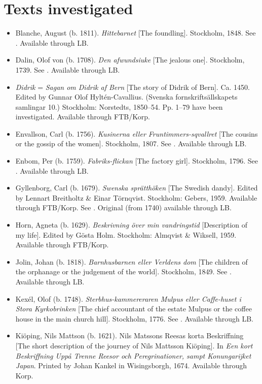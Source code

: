\documentclass[output=paper]{langscibook}
\begin{document}
\section*{Texts investigated}
\begin{itemize}[label={},noitemsep,leftmargin=\parindent,itemindent=-\parindent]\sloppy
\item Blanche, August (b. 1811). \textit{Hittebarnet} [The foundling]. Stockholm, 1848. See \citet{MarttalaStromquist2001}. Available through LB.
\item Dalin, Olof von (b. 1708). \textit{Den afwundsiuke} [The jealous one]. Stockholm, 1739. See \citet{MarttalaStromquist2001}. Available through LB.
\item \textit{Didrik} = \textit{Sagan om Didrik af Bern} [The story of Didrik of Bern]. Ca. 1450. Edited by Gunnar Olof Hyltén-Cavallius. (Svenska fornskriftsällskapets samlingar 10.) Stockholm: Norstedts, 1850–54. Pp. 1–79 have been investigated. Available through FTB/Korp.
\item Envallson, Carl (b. 1756). \textit{Kusinerna eller Fruntimmers-sqvallret} [The cousins or the gossip of the women]. Stockholm, 1807. See \citet{MarttalaStromquist2001}. Available through LB.
\item Enbom, Per (b. 1759). \textit{Fabriks-flickan} [The factory girl]. Stockholm, 1796. See \citet{MarttalaStromquist2001}. Available through LB.
\item Gyllenborg, Carl (b. 1679). \textit{Swenska sprätthöken} [The Swedish dandy]. Edited by Lennart Breitholtz \& Einar Törnqvist. Stockholm: Gebers, 1959. Available through FTB/Korp. See \citet{MarttalaStromquist2001}. Original (from 1740) available through LB. 
\item Horn, Agneta (b. 1629). \textit{Beskrivning över min vandringstid} [Description of my life]. Edited by Gösta Holm. Stockholm: Almqvist \& Wiksell, 1959. Available through FTB/Korp.
\item Jolin, Johan (b. 1818). \textit{Barnhusbarnen eller Verldens dom} [The children of the orphanage or the judgement of the world]. Stockholm, 1849. See \citet{MarttalaStromquist2001}. Available through LB.
\item Kexél, Olof (b. 1748). \textit{Sterbhus-kammereraren Mulpus eller Caffe-huset i Stora Kyrkobrinken} [The chief accountant of the estate Mulpus or the coffee house in the main church hill]. Stockholm, 1776. See \citet{MarttalaStromquist2001}. Available through LB.
\item Kiöping, Nils Mattson (b. 1621). Nils Matssons Reesas korta Beskriffning [The short description of the journey of Nils Mattsson Kiöping]. In \textit{Een kort Beskriffning Uppå Trenne Reesor och Peregrinationer, sampt Konungarijket Japan}. Printed by Johan Kankel in Wisingsborgh, 1674. Available through Korp.

\end{itemize}
\end{document}
